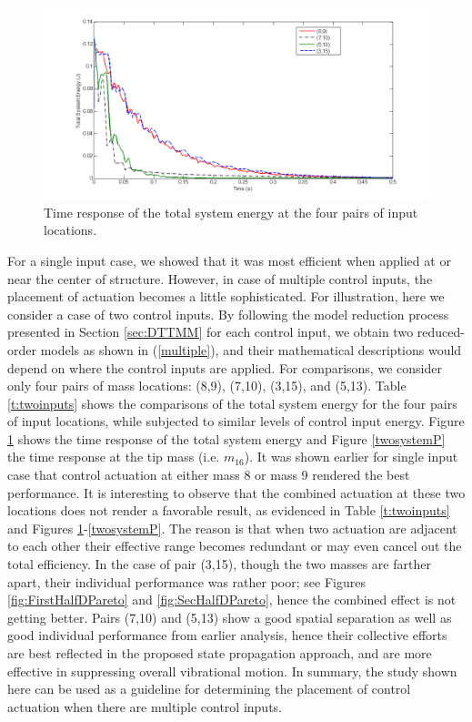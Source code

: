 \documentclass[11pt]{ucthesis}
\begin{document}
\begin{figure}[thpb]
\centering
\includegraphics[width=1\linewidth]{Figures/twoinputE.png}
\caption{Time response of the total system energy at the four pairs of input locations.}
\label{twosystemE}
\end{figure}

For a single input case, we showed that it was most efficient when applied at or near the center of structure. However, in case of multiple control inputs, the placement of actuation becomes a little sophisticated. For illustration, here we consider a case of two control inputs. By following the model reduction process presented in Section \ref{sec:DTTMM} for each control input, we obtain two reduced-order models as shown in (\ref{multiple}), and their mathematical descriptions would depend on where the control inputs are applied. For comparisons, we consider only four pairs of mass locations: (8,9), (7,10), (3,15), and (5,13). Table \ref{t:twoinputs} shows the comparisons of the total system energy for the four pairs of input locations, while subjected to similar levels of control input energy. Figure \ref{twosystemE} shows the time response of the total system energy and Figure \ref{twosystemP} the time response at the tip mass (i.e. $m_{16}$). It was shown earlier for single input case that control actuation at either mass 8 or mass 9 rendered the best performance. It is interesting to observe that the combined actuation at these two locations does not render a favorable result, as evidenced in Table \ref{t:twoinputs} and Figures \ref{twosystemE}-\ref{twosystemP}. The reason is that when two actuation are adjacent to each other their effective range becomes redundant or may even cancel out the total efficiency. In the case of pair (3,15), though the two masses are farther apart, their individual performance was rather poor; see Figures \ref{fig:FirstHalfDPareto} and \ref{fig:SecHalfDPareto}, hence the combined effect is not getting better. Pairs (7,10) and (5,13) show a good spatial separation as well as good individual performance from earlier analysis, hence their collective efforts are best reflected in the proposed state propagation approach, and are more effective in suppressing overall vibrational motion. In summary, the study shown here can be used as a guideline for determining the placement of control actuation when there are multiple control inputs.
\end{document}
